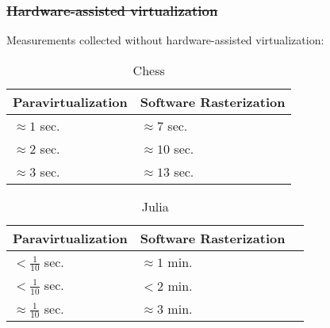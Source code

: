 \begin{frame}
\frametitle{\sout{Hardware-assisted virtualization}}

\begin{center}
Measurements collected without hardware-assisted virtualization:
\end{center}

\begin{table}[]
\centering
\caption{Chess}
\begin{tabular}{ll}
\hline
Paravirtualization & Software Rasterization \\ \hline
$\approx 1$ sec. & $\approx 7$ sec. \\
$\approx 2$ sec. & $\approx 10$ sec. \\
$\approx 3$ sec. & $\approx 13$ sec. \\ \hline
\end{tabular}
\end{table}

\begin{table}[]
\centering
\caption{Julia}
\begin{tabular}{lll}
\hline
Paravirtualization & Software Rasterization \\ \hline
$<\frac{1}{10}$ sec. & $\approx 1$ min. \\
$<\frac{1}{10}$ sec. & $<2$ min. \\
$\approx \frac{1}{10}$ sec. & $\approx 3$ min. \\ \hline
\end{tabular}
\end{table}

\end{frame}
